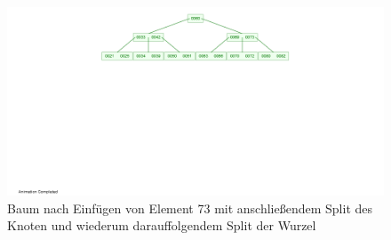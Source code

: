 \documentclass[12pt]{scrartcl}
\begin{document}
\begin{figure}[h!]
\begin{center}
\includegraphics[scale=1]{B-Tree9.png}
\caption{Baum nach Einfügen von Element 73 mit anschließendem Split des Knoten und wiederum darauffolgendem Split der Wurzel}
\end{center}
\end{figure}



\end{document}
